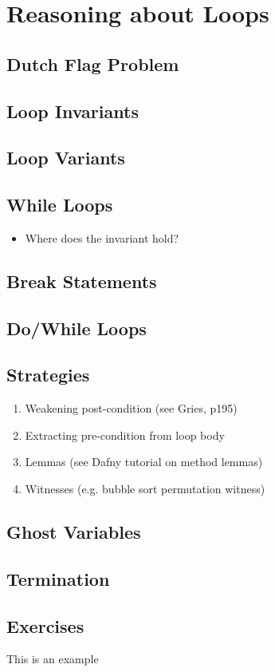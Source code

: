 \chapter{Reasoning about Loops}
\label{c_reasoning_loops}

\section{Dutch Flag Problem}

\section{Loop Invariants}
\section{Loop Variants}
\section{While Loops}
\begin{itemize}
\item Where does the invariant hold?
\end{itemize}
\section{Break Statements}
\section{Do/While Loops}
\section{Strategies}
\begin{enumerate}
\item Weakening post-condition (see Gries, p195)
\item Extracting pre-condition from loop body
\item Lemmas (see Dafny tutorial on method lemmas)
\item Witnesses (e.g. bubble sort permutation witness)
\end{enumerate}
\section{Ghost Variables}

\section{Termination}
\section{Exercises}

\begin{ex}
This is an example
\end{ex}